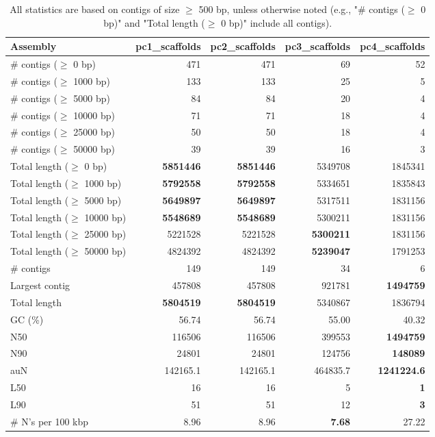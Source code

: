 \documentclass[12pt,a4paper]{article}
\begin{document}
\begin{table}[ht]
\begin{center}
\caption{All statistics are based on contigs of size $\geq$ 500 bp, unless otherwise noted (e.g., "\# contigs ($\geq$ 0 bp)" and "Total length ($\geq$ 0 bp)" include all contigs).}
\begin{tabular}{|l*{4}{|r}|}
\hline
Assembly & pc1\_scaffolds & pc2\_scaffolds & pc3\_scaffolds & pc4\_scaffolds \\ \hline
\# contigs ($\geq$ 0 bp) & 471 & 471 & 69 & 52 \\ \hline
\# contigs ($\geq$ 1000 bp) & 133 & 133 & 25 & 5 \\ \hline
\# contigs ($\geq$ 5000 bp) & 84 & 84 & 20 & 4 \\ \hline
\# contigs ($\geq$ 10000 bp) & 71 & 71 & 18 & 4 \\ \hline
\# contigs ($\geq$ 25000 bp) & 50 & 50 & 18 & 4 \\ \hline
\# contigs ($\geq$ 50000 bp) & 39 & 39 & 16 & 3 \\ \hline
Total length ($\geq$ 0 bp) & {\bf 5851446} & {\bf 5851446} & 5349708 & 1845341 \\ \hline
Total length ($\geq$ 1000 bp) & {\bf 5792558} & {\bf 5792558} & 5334651 & 1835843 \\ \hline
Total length ($\geq$ 5000 bp) & {\bf 5649897} & {\bf 5649897} & 5317511 & 1831156 \\ \hline
Total length ($\geq$ 10000 bp) & {\bf 5548689} & {\bf 5548689} & 5300211 & 1831156 \\ \hline
Total length ($\geq$ 25000 bp) & 5221528 & 5221528 & {\bf 5300211} & 1831156 \\ \hline
Total length ($\geq$ 50000 bp) & 4824392 & 4824392 & {\bf 5239047} & 1791253 \\ \hline
\# contigs & 149 & 149 & 34 & 6 \\ \hline
Largest contig & 457808 & 457808 & 921781 & {\bf 1494759} \\ \hline
Total length & {\bf 5804519} & {\bf 5804519} & 5340867 & 1836794 \\ \hline
GC (\%) & 56.74 & 56.74 & 55.00 & 40.32 \\ \hline
N50 & 116506 & 116506 & 399553 & {\bf 1494759} \\ \hline
N90 & 24801 & 24801 & 124756 & {\bf 148089} \\ \hline
auN & 142165.1 & 142165.1 & 464835.7 & {\bf 1241224.6} \\ \hline
L50 & 16 & 16 & 5 & {\bf 1} \\ \hline
L90 & 51 & 51 & 12 & {\bf 3} \\ \hline
\# N's per 100 kbp & 8.96 & 8.96 & {\bf 7.68} & 27.22 \\ \hline
\end{tabular}
\end{center}
\end{table}
\end{document}
